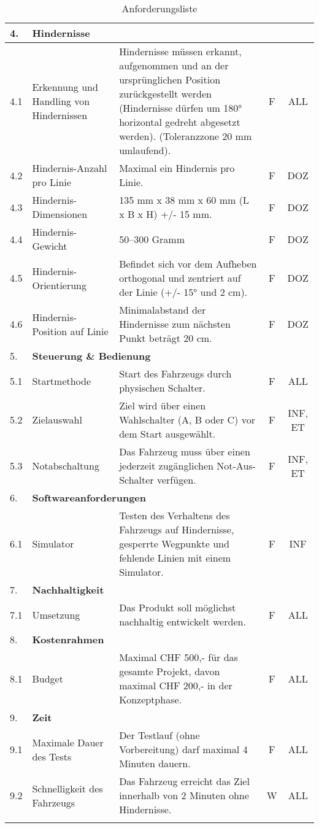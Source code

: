 \documentclass[../main.tex]{subfiles}
\begin{document}
\begin{longtable}[]{@{}lp{4.5cm}p{7.5cm}cc}
  4.  & \multicolumn{4}{l}{\textbf{Hindernisse}} \\ \hline
  4.1 & Erkennung und Handling von Hindernissen & Hindernisse müssen erkannt, aufgenommen und an der ursprünglichen Position zurückgestellt werden (Hindernisse dürfen um 180° horizontal gedreht abgesetzt werden). (Toleranzzone 20 mm umlaufend). & F & ALL \\ \hline
  4.2 & Hindernis-Anzahl pro Linie & Maximal ein Hindernis pro Linie. & F & DOZ \\ \hline
  4.3 & Hindernis-Dimensionen & 135 mm x 38 mm x 60 mm (L x B x H) +/- 15 mm. & F & DOZ \\ \hline
  4.4 & Hindernis-Gewicht & 50–300 Gramm & F & DOZ \\ \hline
  4.5 & Hindernis-Orientierung & Befindet sich vor dem Aufheben orthogonal und zentriert auf der Linie (+/- 15° und 2 cm). & F & DOZ \\ \hline
  4.6 & Hindernis-Position auf Linie & Minimalabstand der Hindernisse zum nächsten Punkt beträgt 20 cm. & F & DOZ \\ \hline

  5. & \multicolumn{4}{l}{\textbf{Steuerung \& Bedienung}} \\ \hline
  5.1 & Startmethode & Start des Fahrzeugs durch physischen Schalter. & F & ALL \\ \hline
  5.2 & Zielauswahl & Ziel wird über einen Wahlschalter (A, B oder C) vor dem Start ausgewählt. & F & INF, ET \\ \hline
  5.3 & Notabschaltung & Das Fahrzeug muss über einen jederzeit zugänglichen Not-Aus-Schalter verfügen. & F & INF, ET \\ \hline

  6.  & \multicolumn{4}{l}{\textbf{Softwareanforderungen}} \\ \hline
  6.1 & Simulator & Testen des Verhaltens des Fahrzeugs auf Hindernisse, gesperrte Wegpunkte und fehlende Linien mit einem Simulator. & F & INF \\ \hline

  7.  & \multicolumn{4}{l}{\textbf{Nachhaltigkeit}} \\ \hline
  7.1 & Umsetzung & Das Produkt soll möglichst nachhaltig entwickelt werden. & F & ALL \\ \hline

  8.  & \multicolumn{4}{l}{\textbf{Kostenrahmen}} \\ \hline
  8.1 & Budget & Maximal CHF 500,- für das gesamte Projekt, davon maximal CHF 200,- in der Konzeptphase. & F & ALL \\ \hline
  
  9.  & \multicolumn{4}{l}{\textbf{Zeit}} \\ \hline
  9.1 & Maximale Dauer des Tests & Der Testlauf (ohne Vorbereitung) darf maximal 4 Minuten dauern. & F & ALL \\ \hline
  9.2 & Schnelligkeit des Fahrzeugs & Das Fahrzeug erreicht das Ziel innerhalb von 2 Minuten ohne Hindernisse. & W & ALL \\ \hline

\caption{Anforderungsliste}
\label{tab:Anforderungsliste}
\end{longtable}
\end{document}
